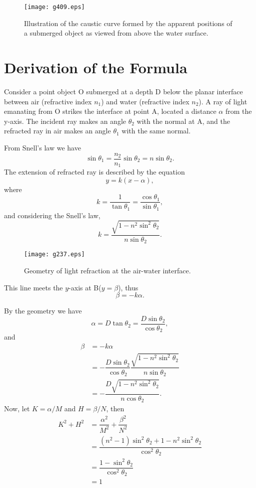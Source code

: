 \documentclass[twocolumn]{article}
\begin{document}
\begin{figure}[htbp]
	\centering
	\texttt{[image: g409.eps]}
	\caption{Illustration of the caustic curve formed by the apparent positions of a submerged object as viewed from above the water surface.}
	\label{fig:caustic_curve}
\end{figure}

\section{Derivation of the Formula}

Consider a point object O submerged at a depth D below the planar interface 
between air (refractive index $n_1$) and water (refractive index $n_2$). 
A ray of light emanating from O strikes the interface at point A, located a 
distance $\alpha$ from the y-axis. The incident ray makes an angle $\theta_2$ 
with the normal at A, and the refracted ray in air makes an angle $\theta_1$ 
with the same normal.

From Snell's law we have
$$ \sin\theta_1 = \frac{n_2}{n_1} \sin\theta_2 = n\sin\theta_2.$$
The extension of refracted ray is described by the equation 
$$y=k(x-\alpha),$$
where 
$$k=\dfrac{1}{\tan\theta_1}=\dfrac{\cos\theta_1}{\sin\theta_1},$$
and considering the Snell's law,
$$k=\dfrac{\sqrt{1-n^2\sin^2\theta_2}}{n\sin\theta_2}.$$

\begin{figure}[htbp]
	\centering
	\texttt{[image: g237.eps]}
	\caption{Geometry of light refraction at the air-water interface.} 
\end{figure}

This line meets the $y$-axis at B($y=\beta$), thus
$$\beta = -k\alpha.$$

By the geometry we have
$$\alpha = D\tan\theta_2 = \dfrac{D\sin\theta_2}{\cos\theta_2},$$
and
$$\begin{aligned}
	\beta &= -k\alpha \\
	&= -\dfrac{D\sin\theta_2}{\cos\theta_2}
	\dfrac{\sqrt{1-n^2\sin^2\theta_2}}{n\sin\theta_2}\\
	&=-\dfrac{D\sqrt{1-n^2\sin^2\theta_2}}{n\cos\theta_2}.
\end{aligned}$$
Now, let $K=\alpha/M$ and $H=\beta/N$, then
$$ \begin{aligned}
	K^2 + H^2 &= \dfrac{\alpha^2}{M^2}+\dfrac{\beta^2}{N^2}\\
	&=\dfrac{\left(n^2-1\right)\sin^2\theta_2 + 1-n^2\sin^2\theta_2}
	{\cos^2\theta_2}\\
	&=\dfrac{1-\sin^2\theta_2}{\cos^2\theta_2}\\
	&=1
\end{aligned}$$
\end{document}
